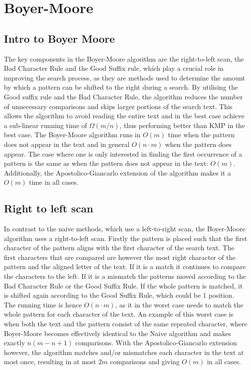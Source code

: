 
\section{Boyer-Moore}

\subsection{Intro to Boyer Moore}
The key components in the Boyer-Moore algorithm are the right-to-left scan, the Bad Character Rule and the Good Suffix rule, which play a crucial role in improving the search process, as they are methods used to determine the amount by which a pattern can be shifted to the right during a search. By utilising the Good suffix rule and the Bad Character Rule, the algorithm reduces the number of unnecessary comparisons and skips larger portions of the search text. This allows the algorithm to avoid reading the entire text and in the best case achieve a sub-linear running time of $\Omega(m/n)$, thus performing better than KMP in the best case. The Boyer-Moore algorithm runs in $O(m)$ time when the pattern does not appear in the text and in general $O(n\cdot m)$ when the pattern does appear. The case where one is only interested in finding the first occurrence of a pattern is the same as when the pattern does not appear in the text: $O(m)$. Additionally, the Apostolico-Giancarlo extension of the algorithm makes it a $O(m)$ time in all cases. 

\subsection{Right to left scan}
In contrast to the naive methods, which use a left-to-right scan, the Boyer-Moore algorithm uses a right-to-left scan. Firstly the pattern is placed such that the first character of the pattern aligns with the first character of the search text. The first characters that are compared are however the most right character of the pattern and the aligned letter of the text. If it is a match it continues to compare the characters to the left. If it is a mismatch the patterns moved according to the Bad Character Rule or the Good Suffix Rule. If the whole pattern is matched, it is shifted again according to the Good Suffix Rule, which could be 1 position. The running time is hence $O(n\cdot m)$, as it in the worst case needs to match the whole pattern for each character of the text. An example of this worst case is when both the text and the pattern consist of the same repeated character, where Boyer-Moore becomes effectively identical to the Naive algorithm and makes exactly $n(m-n+1)$ comparisons. With the Apostolico-Giancarlo extension however, the algorithm matches and/or mismatches each character in the text at most once, resulting in at most $2m$ comparisons and giving $O(m)$ in all cases. 

